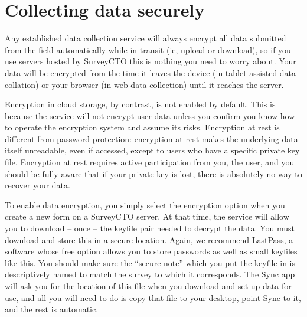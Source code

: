 
\section{Collecting data securely}

Any established data collection service will always encrypt
all data submitted from the field automatically while in transit
(ie, upload or download), so if you use servers hosted by SurveyCTO
this is nothing you need to worry about.
Your data will be encrypted from the time it leaves the device
(in tablet-assisted data collation) or your browser (in web data collection)
until it reaches the server.


Encryption in cloud storage, by contrast, is not enabled by default.
This is because the service will not encrypt user data unless you confirm
you know how to operate the encryption system and assume its risks.
Encryption at rest is different from password-protection:
encryption at rest makes the underlying data itself unreadable,
even if accessed, except to users who have a specific private key file.
Encryption at rest requires active participation from you, the user,
and you should be fully aware that if your private key is lost,
there is absolutely no way to recover your data.

To enable data encryption, you simply select the encryption option
when you create a new form on a SurveyCTO server.
At that time, the service will allow you to download -- once --
the keyfile pair needed to decrypt the data.
You must download and store this in a secure location.
Again, we recommend LastPass, a software whose free option
allows you to store passwords as well as small keyfiles like this.
You should make sure the ``secure note'' which you put the keyfile in
is descriptively named to match the survey to which it corresponds.
The Sync app will ask you for the location of this file
when you download and set up data for use,
and all you will need to do is copy that file to your desktop,
point Sync to it, and the rest is automatic.

